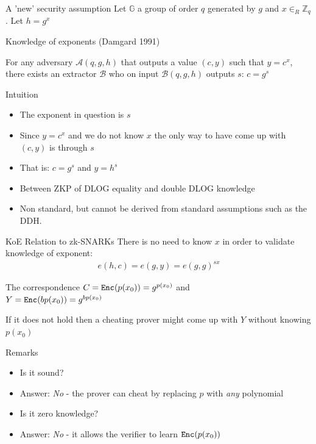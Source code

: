 \documentclass[handout]{beamer}
\begin{document}
\begin{frame}[allowframebreaks]{A 'new' security assumption}
    Let $\mathbb{G}$ a group of order $q$ generated by $g$ and $x \in_R \mathbb{Z}_q$. Let $h = g^x$
    \begin{block}{Knowledge of exponents (Damgard 1991)} 
    
    For any adversary $\mathcal{A}(q,g,h)$ that outputs a value $(c,y)$ such that $y=c^x$,
    there exists an extractor $\mathcal{B}$ who on input $\mathcal{B}(q,g,h)$ 
    outputs $s$: $c=g^s$
    \end{block}
    \framebreak
    \begin{block}{Intuition}
        \begin{itemize}
            \item The exponent in question is $s$  
            \item Since $y=c^x$ and we do not know $x$ the only way to have come up with $(c,y)$ is  
                  through $s$
            \item That is: $c=g^s$ and $y=h^s$  
            \item Between ZKP of DLOG equality and double DLOG knowledge  
            \item Non standard, but cannot be derived from standard assumptions such as the DDH.  
        \end{itemize}
    \end{block}   
\end{frame}

\begin{frame}{KoE Relation to zk-SNARKs}
There is no need to know $x$ in order to validate knowledge of exponent:
\begin{align*}
e(h,c) = e(g,y) = e(g,g)^{sx}
\end{align*}
\pause
\begin{block}{The correspondence}
$C=\mathtt{Enc}(p(x_0))=g^{p(x_0)}$ and \\
$Y=\mathtt{Enc}(bp(x_0))=g^{bp(x_0)}$
\end{block}
If it does not hold then a cheating prover might come up with $Y$ without knowing $p(x_0)$
\end{frame}

\begin{frame}{Remarks}
    \begin{itemize}
        \item Is it sound?
        \pause
        \item Answer: \emph{No} - the prover can cheat by replacing $p$ with \emph{any} polynomial
        \pause
        \item Is it zero knowledge?
        \pause
        \item Answer: \emph{No} - it allows the verifier to learn $\mathtt{Enc}(p(x_0))$
    \end{itemize}
\end{frame}
\end{document}
